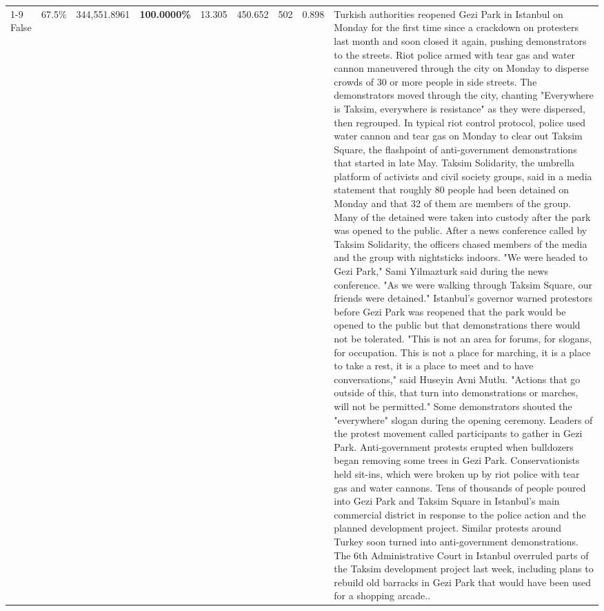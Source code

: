 \begin{table}[H]
\begin{tabular}{lllrlllll}
\cline{1-9}
False & 67.5\% & 344,551.8961 & \bfseries \color{red} 100.0000\% & 13.305 & 450.652 & 502 & 0.898 & Turkish authorities reopened Gezi Park in Istanbul on Monday for the first time since a crackdown on protesters last month and soon closed it again, pushing demonstrators to the streets. Riot police armed with tear gas and water cannon maneuvered through the city on Monday to disperse crowds of 30 or more people in side streets. The demonstrators moved through the city, chanting "Everywhere is Taksim, everywhere is resistance" as they were dispersed, then regrouped. In typical riot control protocol, police used water cannon and tear gas on Monday to clear out Taksim Square, the flashpoint of anti-government demonstrations that started in late May. Taksim Solidarity, the umbrella platform of activists and civil society groups, said in a media statement that roughly 80 people had been detained on Monday and that 32 of them are members of the group. Many of the detained were taken into custody after the park was opened to the public. After a news conference called by Taksim Solidarity, the officers chased members of the media and the group with nightsticks indoors. "We were headed to Gezi Park," Sami Yilmazturk said during the news conference. "As we were walking through Taksim Square, our friends were detained." Istanbul's governor warned protestors before Gezi Park was reopened that the park would be opened to the public but that demonstrations there would not be tolerated. "This is not an area for forums, for slogans, for occupation. This is not a place for marching, it is a place to take a rest, it is a place to meet and to have conversations," said Huseyin Avni Mutlu. "Actions that go outside of this, that turn into demonstrations or marches, will not be permitted." Some demonstrators shouted the "everywhere" slogan during the opening ceremony. Leaders of the protest movement called participants to gather in Gezi Park. Anti-government protests erupted when bulldozers began removing some trees in Gezi Park. Conservationists held sit-ins, which were broken up by riot police with tear gas and water cannons. Tens of thousands of people poured into Gezi Park and Taksim Square in Istanbul's main commercial district in response to the police action and the planned development project. Similar protests around Turkey soon turned into anti-government demonstrations. The 6th Administrative Court in Istanbul overruled parts of the Taksim development project last week, including plans to rebuild old barracks in Gezi Park that would have been used for a shopping arcade.. \\

\end{tabular}
\end{table}
